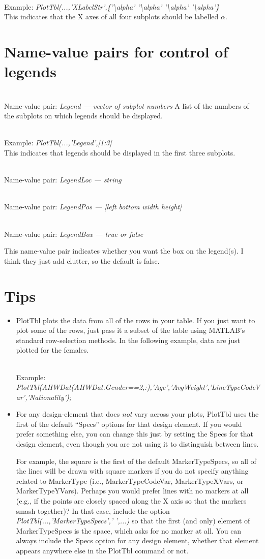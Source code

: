 \documentclass{article}
\newcommand{\example}[1]{\mbox{ } \\ Example: {\it #1} \\ }
\newcommand{\namevalue}[2]{\mbox{ } \\ Name-value pair: {\it #1 --- #2}}
\begin{document}
\example{PlotTbl(...,'XLabelStr',\{'\textbackslash alpha' '\textbackslash alpha' '\textbackslash alpha' '\textbackslash alpha'\}}
This indicates that the X axes of all four subplots should be labelled $\alpha$.

\section{Name-value pairs for control of legends}

\namevalue{Legend}{vector of subplot numbers}
A list of the numbers of the subplots on which legends should be displayed.

\example{PlotTbl(...,'Legend',[1:3]}

This indicates that legends should be displayed in the first three subplots.

\namevalue{LegendLoc}{string}

\namevalue{LegendPos}{[left bottom width height]}

\namevalue{LegendBox}{true or false}

This name-value pair indicates whether you want the box on the legend(s).
I think they just add clutter, so the default is false.

\section{Tips}

\begin{itemize}

\item PlotTbl plots the data from all of the rows in your table.
If you just want to plot some of the rows, just pass it a subset
of the table using MATLAB's standard row-selection methods.
In the following example, data are just plotted for the females.

\example{PlotTbl(AHWDat(AHWDat.Gender==2,:),'Age','AvgWeight','LineTypeCodeVar','Nationality');} 


\item For any design-element that does \emph{not} vary across your plots,
PlotTbl uses the first of the default ``Specs'' options for that design element.
If you would prefer something else, you can change this just by setting the Specs
for that design element, even though you are not using it to distinguish between lines.

For example, the square is the first of the default MarkerTypeSpecs, so all of the lines
will be drawn with square markers if you do not specify anything related to MarkerType
(i.e., MarkerTypeCodeVar, MarkerTypeXVars, or MarkerTypeYVars).
Perhaps you would prefer lines with no markers at all (e.g., if the points are closely
spaced along the X axis so that the markers smash together)?
In that case, include the option {\it PlotTbl(...,'MarkerTypeSpecs',' ',...) }
so that the first (and only) element of MarkerTypeSpecs is the space,
which asks for no marker at all.
You can always include the Specs option for any design element,
whether that element appears anywhere else in the PlotTbl command or not.

\end{itemize}
\end{document}
